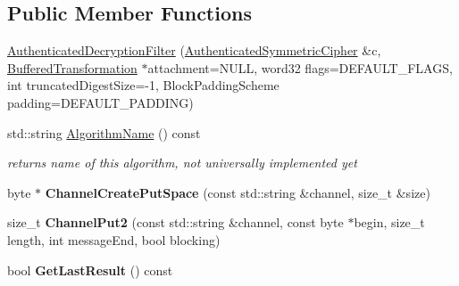 \subsection*{Public Member Functions}
\begin{DoxyCompactItemize}
\item 
\hyperlink{class_authenticated_decryption_filter_a8749a671716e49da0ac686df2d38df1e}{AuthenticatedDecryptionFilter} (\hyperlink{class_authenticated_symmetric_cipher}{AuthenticatedSymmetricCipher} \&c, \hyperlink{class_buffered_transformation}{BufferedTransformation} $\ast$attachment=NULL, word32 flags=DEFAULT\_\-FLAGS, int truncatedDigestSize=-\/1, BlockPaddingScheme padding=DEFAULT\_\-PADDING)
\item 
\hypertarget{class_authenticated_decryption_filter_ac3cd50764b6c79dc3f054450f7994afa}{
std::string \hyperlink{class_authenticated_decryption_filter_ac3cd50764b6c79dc3f054450f7994afa}{AlgorithmName} () const }
\label{class_authenticated_decryption_filter_ac3cd50764b6c79dc3f054450f7994afa}

\begin{DoxyCompactList}\small\item\em returns name of this algorithm, not universally implemented yet \item\end{DoxyCompactList}\item 
\hypertarget{class_authenticated_decryption_filter_a8eb35a364210274e1a63c368a4739149}{
byte $\ast$ {\bfseries ChannelCreatePutSpace} (const std::string \&channel, size\_\-t \&size)}
\label{class_authenticated_decryption_filter_a8eb35a364210274e1a63c368a4739149}

\item 
\hypertarget{class_authenticated_decryption_filter_af29b21590d82a985e63540276b0fde75}{
size\_\-t {\bfseries ChannelPut2} (const std::string \&channel, const byte $\ast$begin, size\_\-t length, int messageEnd, bool blocking)}
\label{class_authenticated_decryption_filter_af29b21590d82a985e63540276b0fde75}

\item 
\hypertarget{class_authenticated_decryption_filter_a3e7b09a2cda8b3d53c1bd083800050a5}{
bool {\bfseries GetLastResult} () const }
\label{class_authenticated_decryption_filter_a3e7b09a2cda8b3d53c1bd083800050a5}

\end{DoxyCompactItemize}
